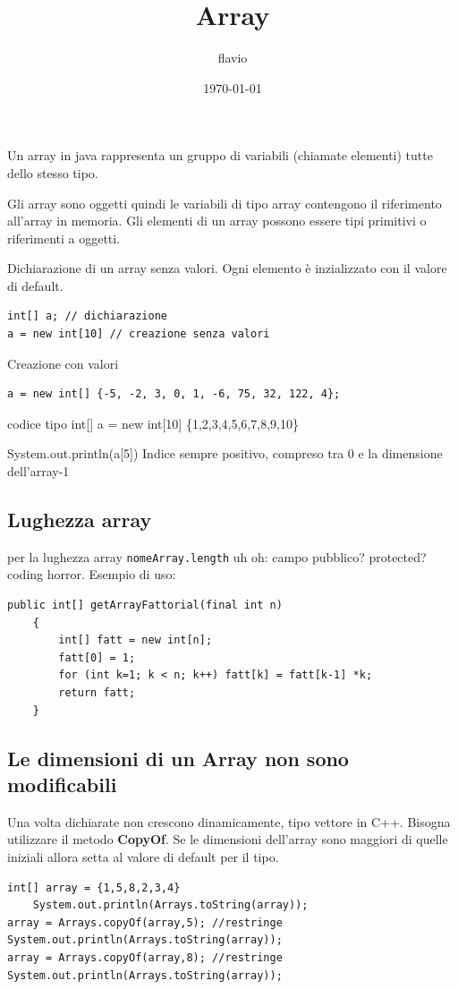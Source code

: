\documentclass[11pt]{article}
\author{flavio}
\date{\today}
\title{Array}
\begin{document}
\maketitle
\tableofcontents

Un array in java rappresenta un gruppo di variabili (chiamate elementi) tutte dello stesso tipo.

Gli array sono oggetti quindi le variabili di tipo array contengono il riferimento all'array in memoria. Gli elementi di un array possono essere tipi primitivi o riferimenti a oggetti.

Dichiarazione di un array senza valori. Ogni elemento è inzializzato con il valore di default.

\begin{verbatim}
int[] a; // dichiarazione
a = new int[10] // creazione senza valori

\end{verbatim}

Creazione con valori
\begin{verbatim}
a = new int[] {-5, -2, 3, 0, 1, -6, 75, 32, 122, 4};
\end{verbatim}

codice tipo
int[] a = new int[10] \{1,2,3,4,5,6,7,8,9,10\}

System.out.println(a[5])
Indice sempre positivo, compreso tra 0 e la dimensione dell'array-1
\subsection{Lughezza array}
\label{sec:orgc67de1f}
per la lughezza array \texttt{nomeArray.length} uh oh: campo pubblico? protected? coding horror.
Esempio di uso:
\begin{verbatim}
public int[] getArrayFattorial(final int n)
    {
        int[] fatt = new int[n];
        fatt[0] = 1;
        for (int k=1; k < n; k++) fatt[k] = fatt[k-1] *k;
        return fatt;
    }
\end{verbatim}
\subsection{Le dimensioni di un Array non sono modificabili}
\label{sec:org64d43e6}
Una volta dichiarate non crescono dinamicamente, tipo vettore in C++. Bisogna utilizzare il metodo \textbf{CopyOf}. Se le dimensioni dell'array sono maggiori di quelle iniziali allora setta al valore di default per il tipo.
\begin{verbatim}
int[] array = {1,5,8,2,3,4}
    System.out.println(Arrays.toString(array));
array = Arrays.copyOf(array,5); //restringe
System.out.println(Arrays.toString(array));
array = Arrays.copyOf(array,8); //restringe
System.out.println(Arrays.toString(array));
\end{verbatim}
\end{document}
